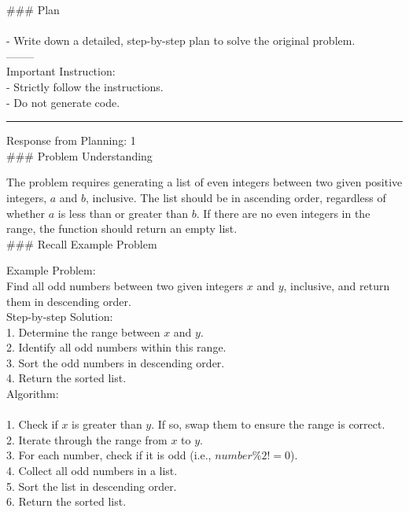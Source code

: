 \#\#\# Plan\\
 \\
- Write down a detailed, step-by-step plan to solve the \*\*original problem\*\*.\\

--------\\
\*\*Important Instruction:\*\*\\
- Strictly follow the instructions.\\
- Do not generate code.\\

\vspace{0.75cm} 
\hrule
\vspace{0.75cm}

Response from Planning: 1\\

\#\#\# Problem Understanding

The problem requires generating a list of even integers between two given positive integers, $a$ and $b$, inclusive. The list should be in ascending order, regardless of whether $a$ is less than or greater than $b$. If there are no even integers in the range, the function should return an empty list. \\

\#\#\# Recall Example Problem

\*\*Example Problem:\*\*\\

Find all odd numbers between two given integers $x$ and $y$, inclusive, and return them in descending order.\\

\*\*Step-by-step Solution:\*\*\\

1. Determine the range between $x$ and $y$.\\
2. Identify all odd numbers within this range.\\
3. Sort the odd numbers in descending order.\\
4. Return the sorted list.\\

\*\*Algorithm:\*\*\\
 \\
1. Check if $x$ is greater than $y$. If so, swap them to ensure the range is correct.\\
2. Iterate through the range from $x$ to $y$.\\
3. For each number, check if it is odd (i.e., $number \% 2 != 0$).\\
4. Collect all odd numbers in a list.\\
5. Sort the list in descending order.\\
6. Return the sorted list.\\

